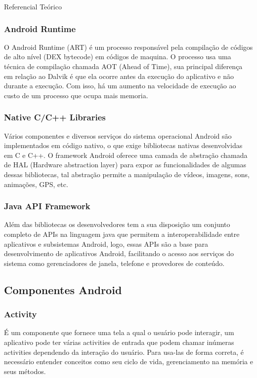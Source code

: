 \documentclass[
	12pt,				%
	openright,			%
	twoside,			%
	a4paper,			%
	english,			%
	french,				%
	spanish,			%
	brazil				%
	]{abntex2}
\begin{document}
\begin{chapter}{Referencial Teórico}
\subsubsection{Android Runtime}
O Android Runtime (ART) é um processo responsável pela compilação de códigos de alto nível (DEX bytecode) em códigos de maquina.
O processo usa uma técnica de compilação chamada AOT (Ahead of Time), sua principal diferença em relação ao Dalvik é que ela ocorre antes 
da execução do aplicativo e não durante a execução. Com isso, há um aumento na velocidade de execução ao custo de um processo que ocupa mais memoria.

\subsubsection{Native C/C++ Libraries}
Vários componentes e diversos serviços do sistema operacional Android são implementados em código nativo,
 o que exige bibliotecas nativas desenvolvidas em C e C++.
O framework Android oferece uma camada de abstração chamada de HAL (Hardware abstraction layer) para expor as funcionalidades de algumas dessas bibliotecas,
 tal abstração permite a manipulação de vídeos, imagens, sons, animações, GPS, etc.

\subsubsection{Java API Framework}
Além das bibliotecas os desenvolvedores tem a sua disposição um conjunto completo de APIs na linguagem java que permitem a interoperabilidade entre aplicativos e subsistemas Android, logo, essas APIs são a base para desenvolvimento de aplicativos Android, facilitando o acesso aos serviços do sistema como gerenciadores de janela, telefone e provedores de conteúdo.

\subsection{Componentes Android}
\subsubsection{Activity}  \label{activity}
É um componente que fornece uma tela a qual o usuário pode interagir, um aplicativo pode ter várias activities de entrada que podem chamar inúmeras activities dependendo da interação do usuário. Para usa-las de forma correta, é necessário entender conceitos como seu ciclo de vida, gerenciamento na memória e seus métodos. 


\end{chapter}
\end{document}
